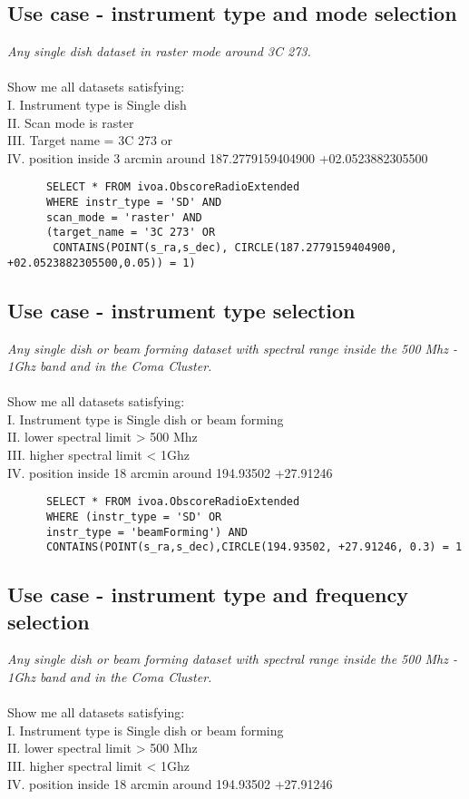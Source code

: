 \subsection{Use case -  instrument type and mode selection }
\textit{Any single dish  dataset  in raster mode around 3C 273.}\\ \\
Show me all datasets satisfying:\\
I. Instrument type is Single dish \\
II. Scan mode is raster \\
III. Target name = 3C 273 or \\
IV. position inside 3 arcmin around  	187.2779159404900 +02.0523882305500
\begin{verbatim}
      SELECT * FROM ivoa.ObscoreRadioExtended
      WHERE instr_type = 'SD' AND
      scan_mode = 'raster' AND
      (target_name = '3C 273' OR
       CONTAINS(POINT(s_ra,s_dec), CIRCLE(187.2779159404900, +02.0523882305500,0.05)) = 1)     
\end{verbatim}

\subsection{Use case - instrument type selection}
\textit{Any single dish or beam forming dataset  with spectral range inside the 500 Mhz - 1Ghz band and in the Coma Cluster.}\\ \\
Show me all datasets satisfying:\\
I. Instrument type is Single dish or beam forming \\
II. lower spectral limit > 500 Mhz \\
III. higher spectral limit < 1Ghz \\
IV. position inside 18 arcmin around 194.93502 +27.91246
\begin{verbatim}
      SELECT * FROM ivoa.ObscoreRadioExtended
      WHERE (instr_type = 'SD' OR
      instr_type = 'beamForming') AND
      CONTAINS(POINT(s_ra,s_dec),CIRCLE(194.93502, +27.91246, 0.3) = 1     
\end{verbatim}


\subsection{Use case - instrument type and frequency selection }
\textit{Any single dish or beam forming dataset  with spectral range inside the 500 Mhz - 1Ghz band and in the Coma Cluster.}\\ \\
Show me all datasets satisfying:\\
I. Instrument type is Single dish or beam forming \\
II. lower spectral limit > 500 Mhz \\
III. higher spectral limit < 1Ghz \\
IV. position inside 18 arcmin around 194.93502 +27.91246

